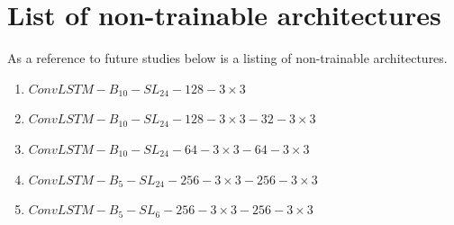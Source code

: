 \cleardoublepage
\chapter{List of non-trainable architectures} \label{app:list_non_trainable_architectures}
As a reference to future studies below is a listing of non-trainable architectures.
\begin{enumerate}
    \item $ConvLSTM-B_{10}-SL_{24}-128-3\times3$
    \item $ConvLSTM-B_{10}-SL_{24}-128-3\times3-32-3\times3$
    \item $ConvLSTM-B_{10}-SL_{24}-64-3\times3-64-3\times3$
    \item $ConvLSTM-B_{5}-SL_{24}-256-3\times3-256-3\times3$
    \item $ConvLSTM-B_{5}-SL_{6}-256-3\times3-256-3\times3$
\end{enumerate}

\cleardoublepage
